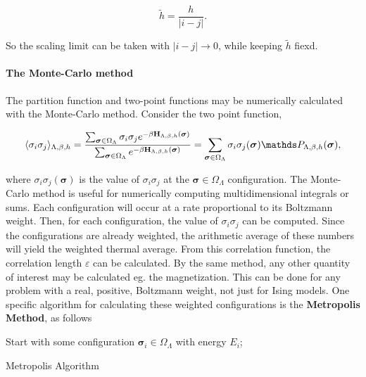 \documentclass{homework}
\begin{document}
$$
    \tilde{h} = \frac{h}{|i-j|}.
$$

So the scaling limit can be taken with $|i-j| \rightarrow 0$, while keeping $\tilde{h}$ fiexd. 

\clearpage

\paragraph{\textbf{The Monte-Carlo method}}

The partition function and two-point functions may be numerically calculated with the Monte-Carlo method. Consider the two point function, 

\begin{equation}
    \langle \sigma_i \sigma_j \rangle_{\Lambda, \beta, h} = \frac{\sum_{{\bm \sigma} \in \Omega_{\Lambda}} \sigma_i \sigma_j e^{-\beta {\bf H}_{\Lambda, \beta, h}({\bm \sigma})}}{\sum_{{\bm \sigma} \in \Omega_{\Lambda}} e^{-\beta {\bf H}_{\Lambda, \beta, h}({\bm \sigma})}} = \sum_{{\bm \sigma} \in \Omega_{\Lambda}} \sigma_i \sigma_j({\bm \sigma}) \prob_{\Lambda, \beta, h}{({\bm \sigma})},
\end{equation}

where $\sigma_i \sigma_j({\bm \sigma})$ is the value of $\sigma_i \sigma_j$ at the ${\bm \sigma} \in \Omega_{\Lambda}$ configuration. The Monte-Carlo method is useful for numerically computing multidimensional integrals or sums. Each configuration will occur at a rate proportional to its Boltzmann weight. Then, for each configuration, the value of $\sigma_i \sigma_j$ can be computed. Since the configurations are already weighted, the arithmetic average of these numbers will yield the weighted thermal average. From this correlation function, the correlation length $\varepsilon$ can be calculated. By the same method, any other quantity of interest may be calculated eg. the magnetization. This can be done for any problem with a real, positive, Boltzmann weight, not just for Ising models. One specific algorithm for calculating these weighted configurations is the \textbf{Metropolis Method}, as follows \\

\begin{algorithm}[H]
 \KwResult{}
 Start with some configuration ${\bm \sigma}_i \in \Omega_{\Lambda}$ with energy $E_i$;\
 \caption{Metropolis Algorithm}
\end{algorithm}
\end{document}
